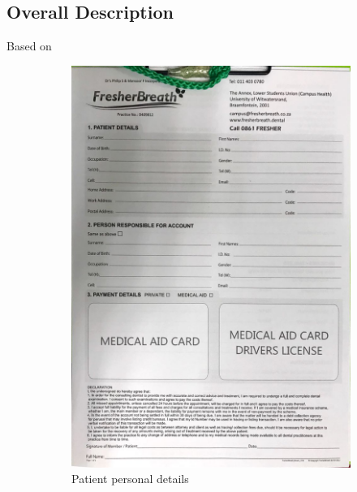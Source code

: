 \documentclass[11 pt]{article}
\begin{document}
\subsection{Overall Description}
Based on 
\begin{figure}

\centering
\begin{subfigure}{.6\textwidth}
  \centering
  \includegraphics[width=1.2\linewidth, left]{new_patient_paper_form.jpeg}
  \caption{Patient personal details}
  \label{fig:sub1}
\end{subfigure}%
\begin{subfigure}{.6\textwidth}
  \centering

\end{subfigure}
\end{figure}
\end{document}
